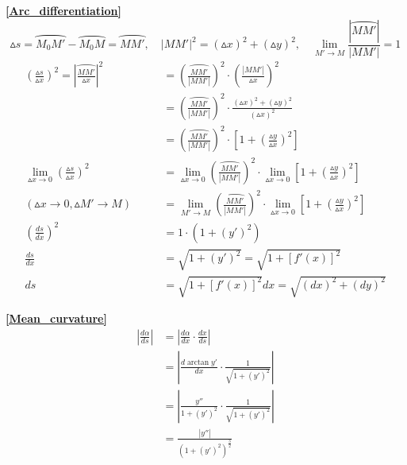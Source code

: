 \textbf{\large \ref{Arc_differentiation}}
$$\vartriangle s=\wideparen{M_0M'}-\wideparen{M_0M}=\wideparen{MM'},\quad \left|MM'\right|^2=(\vartriangle x)^2+(\vartriangle y)^2,\quad \lim\limits_{M'\to M}\frac{\left|\wideparen{MM'}\right|}{\left|MM'\right|}=1$$
\begin{align*}
    \left(\frac{\vartriangle s}{\vartriangle x}\right)^2=\left|\frac{\wideparen{MM'}}{\vartriangle x}\right|^2
   &=\left(\frac{\wideparen{MM'}}{\left|MM'\right|}\right)^2\cdot\left(\frac{\left|MM'\right|}{\vartriangle x}\right)^2\\
   &=\left(\frac{\wideparen{MM'}}{\left|MM'\right|}\right)^2\cdot\frac{(\vartriangle x)^2+(\vartriangle y)^2}{(\vartriangle x)^2}\\
   &=\left(\frac{\wideparen{MM'}}{\left|MM'\right|}\right)^2\cdot\left[1+\left(\frac{\vartriangle y}{\vartriangle x}\right)^2\right]\\
   \lim\limits_{\vartriangle x \to 0}\left(\frac{\vartriangle s}{\vartriangle x}\right)^2&= \lim\limits_{\vartriangle x \to 0}\left(\frac{\wideparen{MM'}}{\left|MM'\right|}\right)^2\cdot\lim\limits_{\vartriangle x \to 0}\left[1+\left(\frac{\vartriangle y}{\vartriangle x}\right)^2\right]\\
   (\vartriangle x \rightarrow 0,\vartriangle M' \rightarrow M)\qquad  &= \lim\limits_{M' \to M}\left(\frac{\wideparen{MM'}}{\left|MM'\right|}\right)^2\cdot\lim\limits_{\vartriangle x \to 0}\left[1+\left(\frac{\vartriangle y}{\vartriangle x}\right)^2\right]\\
    \left(\frac{ds}{dx}\right)^2&=1\cdot (1+(y')^2)\\
    \frac{ds}{dx}&=\sqrt{1+(y')^2}=\sqrt{1+\left[f'(x)\right]^2}\\
    ds&=\sqrt{1+\left[f'(x)\right]^2}dx=\sqrt{(dx)^2+(dy)^2}
\end{align*}

\textbf{\large \ref{Mean_curvature}}
\begin{align*}
    \left|\frac{d\alpha}{ds}\right|&=\left|\frac{d\alpha}{dx}\cdot\frac{dx}{ds}\right|\\
    &=\left|\frac{d\arctan y'}{dx}\cdot\frac{1}{\sqrt{1+(y')^2}}\right|\\
    &=\left|\frac{y''}{1+(y')^2}\cdot\frac{1}{\sqrt{1+(y')^2}}\right|\\
    &=\frac{\left|y''\right|}{\left(1+(y')^2\right)^{\frac{3}{2}}}
\end{align*}

